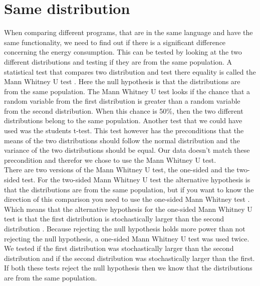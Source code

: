 \section{Same distribution}
When comparing different programs, that are in the same language and have the same functionality, we need to find out if there is a significant difference concerning the energy consumption. This can be tested by looking at the two different distributions and testing if they are from the same population. A statistical test that compares two distribution and test there equality is called the Mann Whitney U test \cite{mann1947test}. Here the null hypothesis is that the distributions are from the same population. The Mann Whitney U test looks if the chance that a random variable from the first distribution is greater than a random variable from the second distribution. When this chance is 50\%, then the two different distributions belong to the same population. Another test that we could have used was the students t-test. This test however has the preconditions that the means of the two distributions should follow the normal distribution and the variance of the two distributions should be equal. Our data doesn't match these precondition and therefor we chose to use the Mann Whitney U test.\\

There are two versions of the Mann Whitney U test, the one-sided and the two-sided test. For the two-sided Mann Whitney U test the alternative hypothesis is that the distributions are from the same population, but if you want to know the direction of this comparison you need to use the one-sided Mann Whitney test \cite{nachar2008mann}. Which means that the alternative hypothesis for the one-sided Mann Whitney U test is that the first distribution is stochastically larger than the second distribution \cite{nachar2008mann}. Because rejecting the null hypothesis holds more power than not rejecting the null hypothesis, a one-sided Mann Whitney U test was used twice. We tested if the first distribution was stochastically larger than the second distribution and if the second distribution was stochastically larger than the first. If both these tests reject the null hypothesis then we know that the distributions are from the same population.

